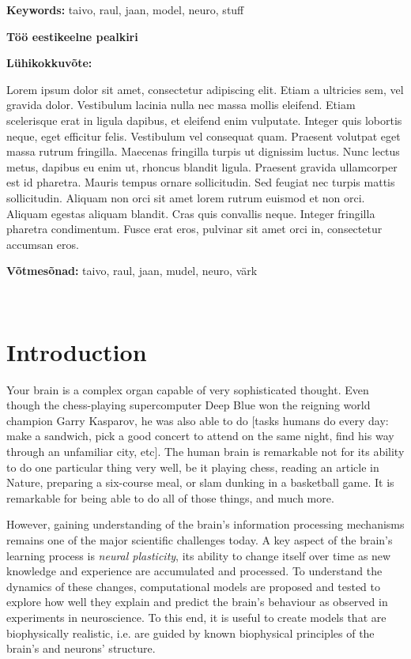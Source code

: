 \documentclass[a4paper,12pt]{report}
\theoremstyle{definition}
\begin{document}
\textbf{Keywords:} taivo, raul, jaan, model, neuro, stuff

\vspace{1.5cm}



{\textbf
{\Large Töö eestikeelne pealkiri}}

\textbf{Lühikokkuvõte:}

Lorem ipsum dolor sit amet, consectetur adipiscing elit. Etiam a ultricies sem, vel gravida dolor. Vestibulum lacinia nulla nec massa mollis eleifend. Etiam scelerisque erat in ligula dapibus, et eleifend enim vulputate. Integer quis lobortis neque, eget efficitur felis. Vestibulum vel consequat quam. Praesent volutpat eget massa rutrum fringilla. Maecenas fringilla turpis ut dignissim luctus. Nunc lectus metus, dapibus eu enim ut, rhoncus blandit ligula. Praesent gravida ullamcorper est id pharetra. Mauris tempus ornare sollicitudin. Sed feugiat nec turpis mattis sollicitudin. Aliquam non orci sit amet lorem rutrum euismod et non orci. Aliquam egestas aliquam blandit. Cras quis convallis neque. Integer fringilla pharetra condimentum. Fusce erat eros, pulvinar sit amet orci in, consectetur accumsan eros.

\textbf{Võtmesõnad:} taivo, raul, jaan, mudel, neuro, värk


\
\thispagestyle{empty}
\pagebreak

\tableofcontents
\newpage



\chapter*{Introduction}

Your brain is a complex organ capable of very sophisticated thought. Even though the chess-playing supercomputer Deep Blue won the reigning world champion Garry Kasparov, he was also able to do [tasks humans do every day: make a sandwich, pick a good concert to attend on the same night, find his way through an unfamiliar city, etc]. The human brain is remarkable not for its ability to do one particular thing very well, be it playing chess, reading an article in Nature, preparing a six-course meal, or slam dunking in a basketball game. It is remarkable for being able to do all of those things, and much more.

However, gaining understanding of the brain's information processing mechanisms remains one of the major scientific challenges today. A key aspect of the brain's learning process is \emph{neural plasticity}, its ability to change itself over time as new knowledge and experience are accumulated and processed. To understand the dynamics of these changes, computational models are proposed and tested to explore how well they explain and predict the brain's behaviour as observed in experiments in neuroscience. To this end, it is useful to create models that are biophysically realistic, i.e. are guided by known biophysical principles of the brain's and neurons' structure.
\end{document}
